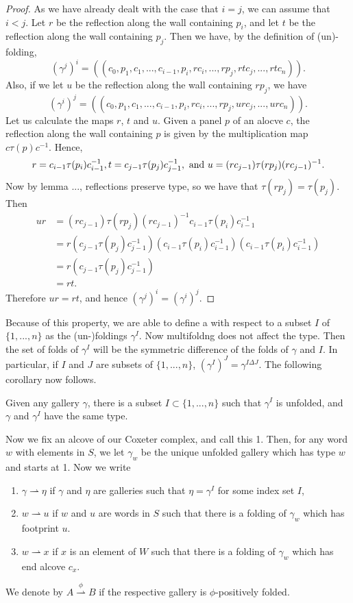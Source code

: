 \documentclass[11pt]{article}
\begin{document}
\begin{proof}
    As we have already dealt with the case that $i=j$, we can assume that $i<j$. Let $r$ be the reflection along the wall containing $p_i$, and let $t$ be the reflection along the wall containing $p_j$. Then we have, by the definition of (un)-folding,
    \[(\gamma^j)^i=((c_0,p_1,c_1,...,c_{i-1},p_i,rc_i,...,rp_j,rtc_j,...,rtc_n)).\]
    Also, if we let $u$ be the reflection along the wall containing $rp_j$, we have
    \[(\gamma^i)^j=((c_0,p_1,c_1,...,c_{i-1},p_i,rc_i,...,rp_j,urc_j,...,urc_n)).\]
    Let us calculate the maps $r$, $t$ and $u$. Given a panel $p$ of an alocve $c$, the reflection along the wall containing $p$ is given by the multiplication map $c\tau(p)c^{-1}$. Hence,
    \[r=c_{i-1}\tau(p_i)c_{i-1}^{-1}, t=c_{j-1}\tau(p_j)c_{j-1}^{-1}, \textnormal{ and } u=(rc_{j-1})\tau(rp_j)(rc_{j-1})^{-1}.\]
    Now by lemma ..., reflections preserve type, so we have that $\tau(rp_j)=\tau(p_j)$. Then
    \[\begin{aligned}
        ur & =(rc_{j-1})\tau(rp_j)(rc_{j-1})^{-1}c_{i-1}\tau(p_i)c_{i-1}^{-1}\\
           & =r(c_{j-1}\tau(p_j)c_{j-1}^{-1})(c_{i-1}\tau(p_i)c_{i-1}^{-1})(c_{i-1}\tau(p_i)c_{i-1}^{-1})\\
           & = r(c_{j-1}\tau(p_j)c_{j-1}^{-1})\\
           & =rt.
    \end{aligned}\]
    Therefore $ur=rt$, and hence $(\gamma^j)^i=(\gamma^i)^j$.
\end{proof}

Because of this property, we are able to define a  with respect to a subset $I$ of $\{1,...,n\}$ as the (un-)foldings $\gamma^I$. Now multifoldng does not affect the type. Then the set of folds of $\gamma^I$ will be the symmetric difference of the folds of $\gamma$ and $I$. In particular, if $I$ and $J$ are subsets of $\{1,...,n\}$, $(\gamma^I)^J=\gamma^{I\Delta J}$. The following corollary now follows.

\begin{corollary}
    Given any gallery $\gamma$, there is a subset $I\subset \{1,...,n\}$ such that $\gamma^I$ is unfolded, and $\gamma$ and $\gamma^I$ have the same type.
\end{corollary}


Now we fix an alcove of our Coxeter complex, and call this 1. Then, for any word $w$ with elements in $S$, we let $\gamma_w$ be the unique unfolded gallery which has type $w$ and starts at 1. Now we write
\begin{enumerate}
    \item $\gamma \rightharpoonup \eta$ if $\gamma$ and $\eta$ are galleries such that $\eta = \gamma^I$ for some index set $I$,
    \item $w\rightharpoonup u$ if $w$ and $u$ are words in $S$ such that there is a folding of $\gamma_w$ which has footprint $u$.
    \item $w\rightharpoonup x$ if $x$ is an element of $W$ such that there is a folding of $\gamma_w$ which has end alcove $c_x$. 
\end{enumerate}
We denote by $A\stackrel{\phi}{\rightharpoonup} B$ if the respective gallery is $\phi$-positively folded.
\end{document}
